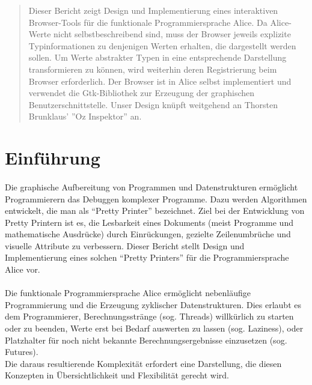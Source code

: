\documentclass[12pt,a4paper]{article}
\begin{document}
\begin{abstract}

Dieser Bericht zeigt Design und Implementierung eines 
interaktiven Browser-Tools f\"{u}r die funktionale Programmiersprache 
Alice. Da Alice-Werte nicht selbstbeschreibend sind, 
muss der Browser jeweils explizite Typinformationen zu denjenigen  
Werten erhalten, die dargestellt werden sollen. 
Um Werte abstrakter Typen in eine entsprechende Darstellung 
transformieren zu k\"{o}nnen, wird weiterhin 
deren Registrierung beim Browser erforderlich. 
Der Browser ist in Alice selbst implementiert und verwendet die Gtk-Bibliothek
zur Erzeugung der graphischen Benutzerschnittstelle.
Unser Design kn\"{u}pft weitgehend an Thorsten Brunklaus' ''Oz Inspektor'' 
\cite{br:oz} an.

\end{abstract}



\section{Einf\"{u}hrung}  

\paragraph{}

Die graphische Aufbereitung von Programmen und Datenstrukturen erm\"{o}glicht 
Programmierern das Debuggen komplexer Programme. 
Dazu werden Algorithmen entwickelt, die man als ``Pretty Printer'' bezeichnet. 
Ziel bei der Entwicklung von Pretty Printern ist es, die Lesbarkeit eines 
Dokuments (meist Programme und mathematische Ausdr\"{u}cke) durch 
Einr\"{u}ckungen, gezielte Zeilenumbr\"{u}che und 
visuelle Attribute zu verbessern.
Dieser Bericht stellt Design und Implementierung 
eines solchen ``Pretty Printers'' f\"{u}r die Programmiersprache Alice vor. 

\paragraph{}

Die funktionale Programmiersprache Alice erm\"{o}glicht nebenl\"{a}ufige 
Programmierung und die Erzeugung zyklischer Datenstrukturen. 
Dies erlaubt es dem Programmierer, Berechnungsstr\"{a}nge (sog. Threads) 
willk\"{u}rlich zu starten oder zu beenden, Werte erst bei 
Bedarf auswerten zu lassen (sog. Laziness), oder Platzhalter 
f\"{u}r noch nicht bekannte Berechnungsergebnisse einzusetzen (sog. Futures).
\\
Die daraus resultierende Komplexit\"{a}t erfordert eine Darstellung, 
die diesen Konzepten in \"{U}bersichtlichkeit und Flexibilit\"{a}t gerecht 
wird.
\end{document}
